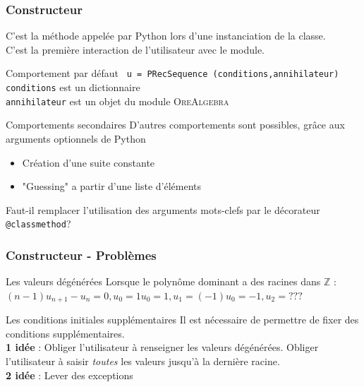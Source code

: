 \documentclass{beamer}
\begin{document}

\begin{frame}
\frametitle{Constructeur}
\begin{center}
C'est la méthode appelée par Python lors d'une instanciation de la classe.\\
C'est la première interaction de l'utilisateur avec le module.\\
\begin{block}{Comportement par défaut}
    \texttt{ u = PRecSequence (conditions,annihilateur) }\\
    \texttt{conditions} est un dictionnaire\\
    \texttt{annihilateur} est un objet du module \textsc{OreAlgebra}\\
\end{block}
\begin{block}{Comportements secondaires}
    D'autres comportements sont possibles, grâce aux arguments optionnels de Python
    \begin{itemize}
        \item Création d'une suite constante
        \item "Guessing" a partir d'une liste d'éléments
    \end{itemize}
\end{block}
{\color{blue} Faut-il remplacer l'utilisation des arguments mots-clefs par le 
    décorateur \texttt{@classmethod}?}
\end{center}
\end{frame}


\begin{frame}
\frametitle{Constructeur - Problèmes}
\begin{center}
\begin{alertblock}{Les valeurs dégénérées}
    Lorsque le polynôme dominant a des racines dans $\mathbb Z$ :\\
    $(n-1)u_{n+1} - u_n =0, u_0=1$\hspace{1cm}$u_0=1,u_1=(-1)u_0=-1, u_2=???$
\end{alertblock}
\pause
\vspace{1cm}
\begin{exampleblock}{Les conditions initiales supplémentaires}
    Il est nécessaire de permettre de fixer des conditions supplémentaires.\\
    \pause
    \textbf{1\iere{} idée} : Obliger l'utilisateur à renseigner les valeurs dégénérées. Obliger 
    l'utilisateur à saisir \textit{toutes} les valeurs jusqu'à la dernière racine.\\
    \pause
    \textbf{2\ieme{} idée} : Lever des exceptions
\end{exampleblock}
\end{center}
\end{frame}
\end{document}
